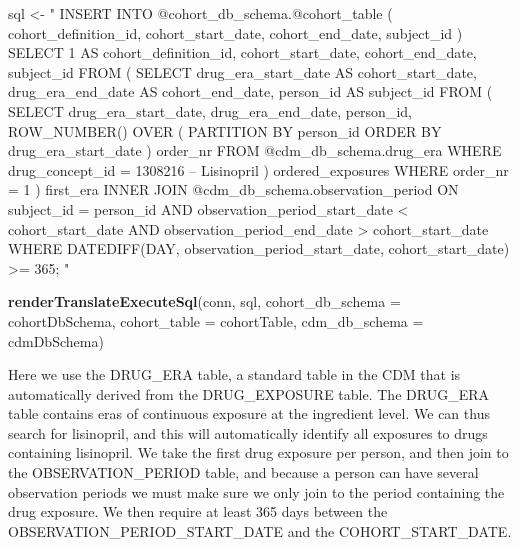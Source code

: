 \documentclass[11pt]{book}
\newenvironment{Shaded}{\begin{snugshade}}{\end{snugshade}}
\newcommand{\KeywordTok}[1]{\textcolor[rgb]{0.13,0.29,0.53}{\textbf{#1}}}
\newcommand{\DataTypeTok}[1]{\textcolor[rgb]{0.13,0.29,0.53}{#1}}
\newcommand{\StringTok}[1]{\textcolor[rgb]{0.31,0.60,0.02}{#1}}
\newcommand{\NormalTok}[1]{#1}
\theoremstyle{definition}
\theoremstyle{definition}
\theoremstyle{definition}
\theoremstyle{remark}
\begin{document}
\begin{Shaded}
\begin{Highlighting}[]
\NormalTok{sql <-}\StringTok{ "}
\StringTok{INSERT INTO @cohort_db_schema.@cohort_table (}
\StringTok{  cohort_definition_id,}
\StringTok{  cohort_start_date,}
\StringTok{  cohort_end_date,}
\StringTok{  subject_id}
\StringTok{)}
\StringTok{SELECT 1 AS cohort_definition_id,}
\StringTok{  cohort_start_date,}
\StringTok{  cohort_end_date,}
\StringTok{  subject_id}
\StringTok{FROM (}
\StringTok{  SELECT drug_era_start_date AS cohort_start_date,}
\StringTok{    drug_era_end_date AS cohort_end_date,}
\StringTok{    person_id AS subject_id}
\StringTok{  FROM (}
\StringTok{    SELECT drug_era_start_date,}
\StringTok{      drug_era_end_date,}
\StringTok{      person_id,}
\StringTok{      ROW_NUMBER() OVER (}
\StringTok{        PARTITION BY person_id}
\StringTok{            ORDER BY drug_era_start_date}
\StringTok{      ) order_nr}
\StringTok{    FROM @cdm_db_schema.drug_era}
\StringTok{    WHERE drug_concept_id = 1308216 -- Lisinopril}
\StringTok{  ) ordered_exposures}
\StringTok{  WHERE order_nr = 1}
\StringTok{) first_era}
\StringTok{INNER JOIN @cdm_db_schema.observation_period}
\StringTok{  ON subject_id = person_id}
\StringTok{    AND observation_period_start_date < cohort_start_date}
\StringTok{    AND observation_period_end_date > cohort_start_date}
\StringTok{WHERE DATEDIFF(DAY,}
\StringTok{               observation_period_start_date,}
\StringTok{               cohort_start_date) >= 365;}
\StringTok{"}

\KeywordTok{renderTranslateExecuteSql}\NormalTok{(conn, sql,}
                          \DataTypeTok{cohort_db_schema =}\NormalTok{ cohortDbSchema,}
                          \DataTypeTok{cohort_table =}\NormalTok{ cohortTable,}
                          \DataTypeTok{cdm_db_schema =}\NormalTok{ cdmDbSchema)}
\end{Highlighting}
\end{Shaded}

Here we use the DRUG\_ERA table, a standard table in the CDM that is
automatically derived from the DRUG\_EXPOSURE table. The DRUG\_ERA table
contains eras of continuous exposure at the ingredient level. We can
thus search for lisinopril, and this will automatically identify all
exposures to drugs containing lisinopril. We take the first drug
exposure per person, and then join to the OBSERVATION\_PERIOD table, and
because a person can have several observation periods we must make sure
we only join to the period containing the drug exposure. We then require
at least 365 days between the OBSERVATION\_PERIOD\_START\_DATE and the
COHORT\_START\_DATE.
\end{document}
